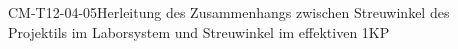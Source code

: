 
\begin{PROP}{CM-T12-04-05}{Herleitung des Zusammenhangs zwischen Streuwinkel des Projektils im Laborsystem und Streuwinkel im effektiven 1KP}
\end{PROP}
